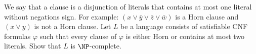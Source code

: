 We say that a  clause is a disjunction of literals that contains at most one literal
without negations sign. For example: $(x \lor \bar{y} \lor \bar{z} \lor \bar{w})$ is a Horn clause and
$(x \lor y)$ is not a Horn clause. Let $L$ be a language consists of satisfiable CNF formulas $\varphi$
such that every clause of $\varphi$ is either Horn or contains at most two literals. Show that $L$ is
$\NP$-complete.